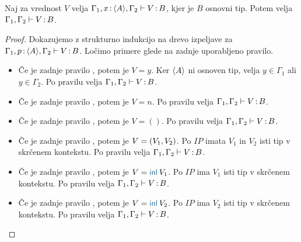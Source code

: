 \begin{lema}\label{lem:tovor-osnovni-tip-skrcitev}
	Naj za vrednost $V$ velja $\Gamma_1, x \mathinner{:} \langle A \rangle, \Gamma_2 \vdash V \mathinner{:} B$, kjer je $B$ osnovni tip. Potem velja $\Gamma_1, \Gamma_2 \vdash V \mathinner{:} B$.
\end{lema}

\begin{proof}
	Dokazujemo z strukturno indukcijo na drevo izpeljave za $\Gamma_1, p \mathinner{:} \langle A \rangle, \Gamma_2 \vdash V \mathinner{:} B$.
	Ločimo primere glede na zadnje uporabljeno pravilo.
	
	\begin{itemize}
		\item[\sitem] Če je zadnje pravilo , potem je $V = y$. Ker $\langle A \rangle$ ni osnoven tip, velja $y \in \Gamma_1$ ali $y \in \Gamma_2$.
		Po pravilu  velja $\Gamma_1, \Gamma_2 \vdash V \mathinner{:} B$.
		
		\item Če je zadnje pravilo , potem je $V = n$. Po pravilu  velja $\Gamma_1, \Gamma_2 \vdash V \mathinner{:} B$.
		
		\item Če je zadnje pravilo , potem je $V = ()$. Po pravilu  velja $\Gamma_1, \Gamma_2 \vdash V \mathinner{:} B$.
		
		\item Če je zadnje pravilo , potem je $V =( V_1 , V_2 )$.
		Po $IP$ imata $V_1$ in $V_2$ isti tip v skrčenem kontekstu.
		Po pravilu  velja $\Gamma_1, \Gamma_2 \vdash V \mathinner{:} B$.
		
		
		\item Če je zadnje pravilo , potem je $V = \tminl{V_1}$.
		Po $IP$ ima $V_1$ isti tip v skrčenem kontekstu.
		Po pravilu  velja $\Gamma_1, \Gamma_2 \vdash V \mathinner{:} B$.
		
		\item Če je zadnje pravilo , potem je $V = \tminl{V_2}$.
		Po $IP$ ima $V_2$ isti tip v skrčenem kontekstu.
		Po pravilu  velja $\Gamma_1, \Gamma_2 \vdash V \mathinner{:} B$.
		

\end{itemize}
\end{proof}
